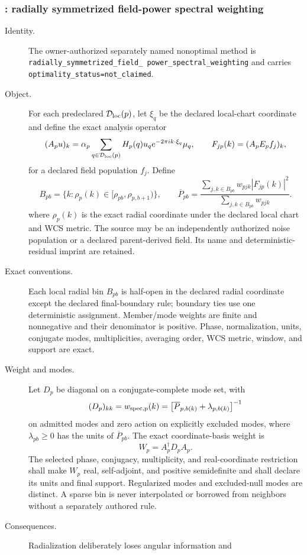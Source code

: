 \subsubsection{: radially symmetrized field-power spectral weighting}
\begin{description}
\item[Identity.] The owner-authorized separately named nonoptimal method is
\texttt{radially\_\allowbreak symmetrized\_\allowbreak field\_\allowbreak
power\_\allowbreak spectral\_\allowbreak weighting} and carries
\texttt{optimality\_status=not\_claimed}.
\item[Object.] For each predeclared $\mathcal{D}_{\rm loc}(p)$, let $\xi_q$ be the
declared local-chart coordinate and define the exact analysis operator
\[
 (A_pu)_k=\alpha_p\sum_{q\in\mathcal{D}_{\rm loc}(p)}
 H_p(q)u_qe^{-2\pi i k\cdot\xi_q}\mu_q,
 \qquad F_{jp}(k)=(A_pE_pf_j)_k,
\]
for a declared field population $f_j$. Define
\[
 B_{pb}=\{k:\rho_p(k)\in[\rho_{pb},\rho_{p,b+1})\},
 \qquad
 \overline P_{pb}=\frac{\sum_{j,k\in B_{pb}}w_{pjk}|F_{jp}(k)|^2}
                         {\sum_{j,k\in B_{pb}}w_{pjk}}.
\]
where $\rho_p(k)$ is the exact radial coordinate under the declared local
chart and WCS metric. The source may be an independently authorized noise population or a declared
parent-derived field. Its name and deterministic-residual imprint are retained.
\item[Exact conventions.] Each local radial bin $B_{pb}$ is half-open in the
declared radial coordinate except the declared final-boundary rule; boundary ties
use one deterministic assignment. Member/mode weights are finite and
nonnegative and their denominator is positive. Phase, normalization, units,
conjugate modes, multiplicities, averaging order, WCS metric, window, and
support are exact.
\item[Weight and modes.] Let $D_p$ be diagonal on a conjugate-complete mode set,
with
\[
 (D_p)_{kk}=w_{\rm spec,p}(k)
 =\bigl[\overline P_{p,b(k)}+\lambda_{p,b(k)}\bigr]^{-1}
\]
on admitted modes and zero action on explicitly excluded modes, where
$\lambda_{pb}\geq0$ has the units of $\overline P_{pb}$. The exact
coordinate-basis weight is
\[
 W_p=A_p^{\dagger}D_pA_p.
\]
The selected phase, conjugacy, multiplicity, and real-coordinate restriction
shall make $W_p$ real, self-adjoint, and positive semidefinite and shall declare
its units and final support. Regularized modes and excluded-null modes are
distinct. A sparse bin is never interpolated or borrowed from neighbors
without a separately authored rule.
\item[Consequences.] Radialization deliberately loses angular information and

\end{description}
